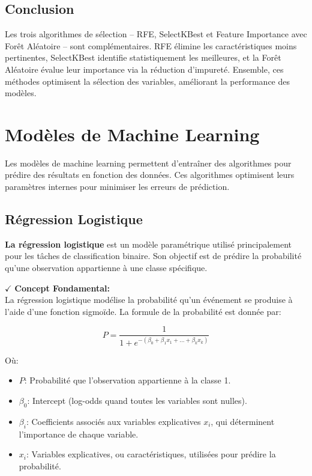 \subsection{Conclusion}

Les trois algorithmes de sélection – RFE, SelectKBest et Feature Importance avec Forêt Aléatoire – sont complémentaires. RFE élimine les caractéristiques moins pertinentes, SelectKBest identifie statistiquement les meilleures, et la Forêt Aléatoire évalue leur importance via la réduction d'impureté. Ensemble, ces méthodes optimisent la sélection des variables, améliorant la performance des modèles.


\section{Modèles de Machine Learning}
Les modèles de machine learning permettent d’entraîner des algorithmes pour prédire des résultats en fonction des données. Ces algorithmes optimisent leurs paramètres internes pour minimiser les erreurs de prédiction.

\subsection{Régression Logistique}

\textbf{La régression logistique} est un modèle paramétrique utilisé principalement pour les tâches de classification binaire. Son objectif est de prédire la probabilité qu'une observation appartienne à une classe spécifique.

\textbf{\(\checkmark\)} \textbf{Concept Fondamental:}\\
La régression logistique modélise la probabilité qu’un événement se produise à l'aide d'une fonction sigmoïde. La formule de la probabilité est donnée par:

\[
P = \frac{1}{1 + e^{-(\beta_0 + \beta_1 x_1 + \dots + \beta_k x_k)}}
\]

Où:
\begin{itemize}
    \item \( P \): Probabilité que l'observation appartienne à la classe 1.
    \item \( \beta_0 \): Intercept (log-odds quand toutes les variables sont nulles).
    \item \( \beta_i \): Coefficients associés aux variables explicatives \( x_i \), qui déterminent l'importance de chaque variable.
    \item \( x_i \): Variables explicatives, ou caractéristiques, utilisées pour prédire la probabilité.
\end{itemize}

